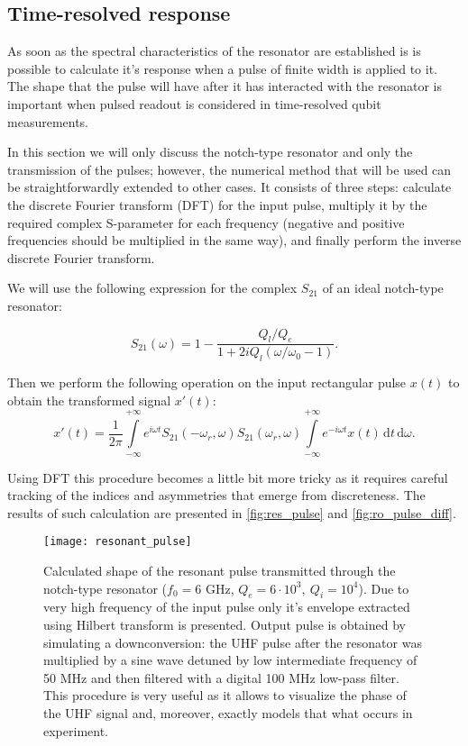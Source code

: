 \documentclass[12pt, twoside]{report}
\newcommand{\diff}{\,\mathrm{d}}
\numberwithin{equation}{section}
\begin{document}
\subsection{Time-resolved response}

As soon as the spectral characteristics of the resonator are established is is possible to calculate it's response when a pulse of finite width is applied to it. The shape that the pulse will have after it has interacted with the resonator is important when pulsed readout is considered in time-resolved qubit measurements. 

In this section we will only discuss the notch-type resonator and only the transmission of the pulses; however, the numerical method that will be used can be straightforwardly extended to other cases. It consists of three steps: calculate the discrete Fourier transform (DFT) for the input pulse, multiply it by the required complex S-parameter for each frequency (negative and positive frequencies should be multiplied in the same way), and finally perform the inverse discrete Fourier transform. 

We will use the following expression for the complex $S_{21}$ of an ideal notch-type resonator\cite{probst2015}:

\[
S_{21} (\omega)= 1 - \frac{Q_l/Q_e}{1 + 2 i Q_l (\omega/\omega_0 - 1)}.
\]

Then we perform the following operation on the input rectangular pulse $x(t)$ to obtain the transformed signal $x'(t)$:
\[
x'(t) = \frac{1}{2\pi}\int\limits_{-\infty}^{+\infty} e^{i\omega t} {S_{21}(-\omega_r, \omega)}S_{21}(\omega_r, \omega)\int\limits_{-\infty}^{+\infty} e^{-i\omega t}x(t) \diff t \diff \omega.
\]

Using DFT this procedure becomes a little bit more tricky as it requires careful tracking of the indices and asymmetries that emerge from discreteness. The results of such calculation are presented in \autoref{fig:res_pulse} and \autoref{fig:ro_pulse_diff}. 


\begin{figure}
\texttt{[image: resonant\_pulse]}
\caption{Calculated shape of the resonant pulse transmitted through the notch-type resonator ($f_0 = 6$ GHz, $Q_e=6 \cdot 10^3,\ Q_i = 10^4$). Due to very high frequency of the input pulse only it's envelope extracted using Hilbert transform is presented. Output pulse is obtained by simulating a downconversion: the UHF pulse after the resonator was multiplied by a sine wave detuned by low intermediate frequency of 50 MHz and then filtered with a digital 100 MHz low-pass filter. This procedure is very useful as it allows to visualize the phase of the UHF signal and, moreover, exactly models that what occurs in experiment.}
\label{fig:res_pulse}
\end{figure}
\end{document}
